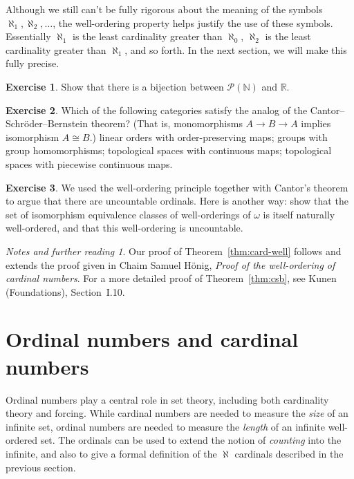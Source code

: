 \documentclass[11pt,oneside]{amsbook}
\newcommand{\NN}{\mathbb N}
\newcommand{\RR}{\mathbb R}
\theoremstyle{definition}
\newtheorem{exerc}{Exercise}[section]
\theoremstyle{plain}
\theoremstyle{definition}
\theoremstyle{remark}
\newtheorem*{notes}{Notes and further reading}
\begin{document}
Although we still can't be fully rigorous about the meaning of the symbols $\aleph_1,\aleph_2,\ldots$, the well-ordering property helps justify the use of these symbols. Essentially $\aleph_1$ is the least cardinality greater than $\aleph_0$, $\aleph_2$ is the least cardinality greater than $\aleph_1$, and so forth. In the next section, we will make this fully precise.

\begin{exerc}
  Show that there is a bijection between $\mathcal P(\NN)$ and $\RR$.
\end{exerc}

\begin{exerc}
  Which of the following categories satisfy the analog of the Cantor--Schr\"oder--Bernstein theorem? (That is, monomorphisms $A\to B\to A$ implies isomorphism $A\cong B$.) linear orders with order-preserving maps; groups with group homomorphisms; topological spaces with continuous maps; topological spaces with piecewise continuous maps.
\end{exerc}

\begin{exerc}
  We used the well-ordering principle together with Cantor's theorem to argue that there are uncountable ordinals. Here is another way: show that the set of isomorphism equivalence classes of well-orderings of $\omega$ is itself naturally well-ordered, and that this well-ordering is uncountable.
\end{exerc}

\begin{notes}
  Our proof of Theorem~\ref{thm:card-well} follows and extends the proof given in Chaim Samuel H\"onig, \emph{Proof of the well-ordering of cardinal numbers}. For a more detailed proof of Theorem~\ref{thm:csb}, see Kunen (Foundations), Section~I.10.
\end{notes}


\section{Ordinal numbers and cardinal numbers}

Ordinal numbers play a central role in set theory, including both cardinality theory and forcing. While cardinal numbers are needed to measure the \emph{size} of an infinite set, ordinal numbers are needed to measure the \emph{length} of an infinite well-ordered set. The ordinals can be used to extend the notion of \emph{counting} into the infinite, and also to give a formal definition of the $\aleph$ cardinals described in the previous section.
\end{document}
